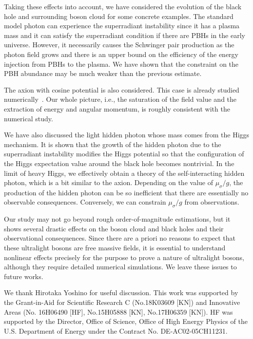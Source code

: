 \documentclass[%
 preprint,
 nofootinbib,
 amsmath,amssymb,
 aps,
 a4paper
]{revtex4-1}
\begin{document}
Taking these effects into account, we have considered the evolution of the black hole and surrounding boson cloud for some concrete examples. The standard model photon can experience the superradiant instability since it has a plasma mass and it can satisfy the superradiant condition if there are PBHs in the early universe. However, it necessarily causes the Schwinger pair production as the photon field grows and there is an upper bound on the efficiency of the energy injection from PBHs to the plasma. We have shown that the constraint on the PBH abundance may be much weaker than the previous estimate.

The axion with cosine potential is also considered. This case is already studied numerically~\cite{Yoshino:2012kn,Yoshino:2019}. Our whole picture, i.e., the saturation of the field value and the extraction of energy and angular momentum, is roughly consistent with the numerical study.

We have also discussed the light hidden photon whose mass comes from the Higgs mechanism. It is shown that the growth of the hidden photon due to the superradiant instability modifies the Higgs potential so that the configuration of the Higgs expectation value around the black hole becomes nontrivial. In the limit of heavy Higgs, we effectively obtain a theory of the self-interacting hidden photon, which is a bit similar to the axion.
Depending on the value of $\mu_\sigma/g$, the production of the hidden photon can be so inefficient that there are essentially no observable consequences. Conversely, we can constrain $\mu_\sigma/g$ from observations.


Our study may not go beyond rough order-of-magnitude estimations, but it shows several drastic effects on the boson cloud and black holes and their observational consequences.
Since there are a priori no reasons to expect that these ultralight bosons are free massive fields, it is essential to understand nonlinear effects precisely for the purpose to prove a nature of ultralight bosons, although they require detailed  numerical simulations. We leave these issues to future works.




\acknowledgments


We thank Hirotaka Yoshino for useful discussion.
This work was supported by the Grant-in-Aid for Scientific Research C (No.18K03609 [KN]) and Innovative Areas (No. 16H06490 [HF], No.15H05888 [KN], No.17H06359 [KN]).
HF was supported by the Director, Office of Science, Office of
High Energy Physics of the U.S. Department of Energy under the
Contract No. DE-AC02-05CH11231.
\end{document}
